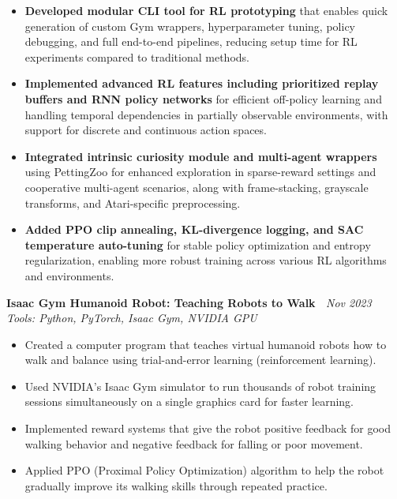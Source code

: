 \documentclass[a4paper,10pt]{article}
\newcommand{\resumeItemListStart}{\begin{itemize}[leftmargin=*,labelsep=1mm,itemsep=0.5mm]}
\newcommand{\resumeItemListEnd}{\end{itemize}\vspace{-2mm}}
\newcommand{\resumeheading}[4]{%
  \item[] \textbf{#1} \hfill \textit{\footnotesize{#4}} \\%
  \textit{\footnotesize{#3}} \\%
  \vspace{-2mm}%
}
\begin{document}
\resumeItemListStart
  \item \textbf{Developed modular CLI tool for RL prototyping} that enables quick generation of custom Gym wrappers, hyperparameter tuning, policy debugging, and full end-to-end pipelines, reducing setup time for RL experiments compared to traditional methods.
  \item \textbf{Implemented advanced RL features including prioritized replay buffers and RNN policy networks} for efficient off-policy learning and handling temporal dependencies in partially observable environments, with support for discrete and continuous action spaces.
  \item \textbf{Integrated intrinsic curiosity module and multi-agent wrappers} using PettingZoo for enhanced exploration in sparse-reward settings and cooperative multi-agent scenarios, along with frame-stacking, grayscale transforms, and Atari-specific preprocessing.
  \item \textbf{Added PPO clip annealing, KL-divergence logging, and SAC temperature auto-tuning} for stable policy optimization and entropy regularization, enabling more robust training across various RL algorithms and environments.
\resumeItemListEnd

\vspace{2.5mm}

\resumeheading
  {Isaac Gym Humanoid Robot: Teaching Robots to Walk~%
    \href{https://github.com/ch33nchan/isaac-humanoid}{\textcolor{darkblue}{\faGithub}}
  }
  {}
  {Tools: Python, PyTorch, Isaac Gym, NVIDIA GPU}
  {Nov 2023}

\vspace{0.5mm}

\resumeItemListStart
  \item Created a computer program that teaches virtual humanoid robots how to walk and balance using trial-and-error learning (reinforcement learning).
  \item Used NVIDIA's Isaac Gym simulator to run thousands of robot training sessions simultaneously on a single graphics card for faster learning.
  \item Implemented reward systems that give the robot positive feedback for good walking behavior and negative feedback for falling or poor movement.
  \item Applied PPO (Proximal Policy Optimization) algorithm to help the robot gradually improve its walking skills through repeated practice.
\resumeItemListEnd

\vspace{2.5mm}
\vspace{2.5mm}
\end{document}
